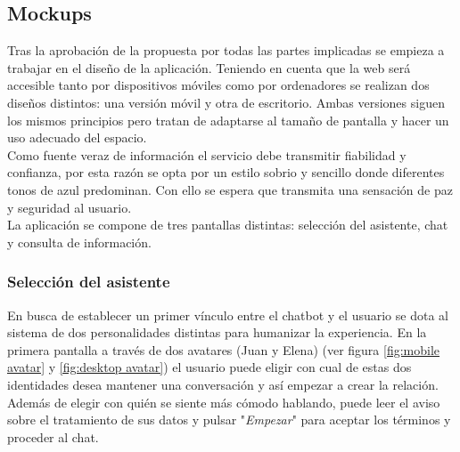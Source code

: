 \subsection{Mockups}
Tras la aprobación de la propuesta por todas las partes implicadas se empieza a trabajar en el diseño de la aplicación. Teniendo en cuenta que la web será accesible tanto por dispositivos móviles como por ordenadores se realizan dos diseños distintos: una versión móvil y otra de escritorio. Ambas versiones siguen los mismos principios pero tratan de adaptarse al tamaño de pantalla y hacer un uso adecuado del espacio.\\

Como fuente veraz de información el servicio debe transmitir fiabilidad y confianza, por esta razón se opta por un estilo sobrio y sencillo donde diferentes tonos de azul predominan. Con ello se espera que transmita una sensación de paz y seguridad al usuario.\\

La aplicación se compone de tres pantallas distintas: selección del asistente, chat y consulta de información.\\

\subsubsection{Selección del asistente}
En busca de establecer un primer vínculo entre el chatbot y el usuario se dota al sistema de dos personalidades distintas para humanizar la experiencia. En la primera pantalla a través de dos avatares (Juan y Elena) (ver figura \ref{fig:mobile avatar} y \ref{fig:desktop avatar}) el usuario puede eligir con cual de estas dos identidades desea mantener una conversación y así empezar a crear la relación. Además de elegir con quién se siente más cómodo hablando, puede leer el aviso sobre el tratamiento de sus datos y pulsar "\textit{Empezar}" para aceptar los términos y proceder al chat.\\


